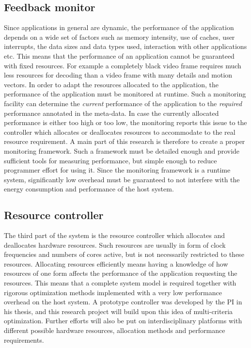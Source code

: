 \documentclass{article}
\begin{document}
\subsection{Feedback monitor}
Since applications in general are dynamic, the performance of the application depends on a wide set of factors such as memory intensity, use of caches, user interrupts, the data sizes and data types used, interaction with other applications etc. 
This means that the performance of an application cannot be guaranteed with fixed resources.
For example a completely black video frame requires much less resources for decoding than a video frame with many details and motion vectors.
In order to adapt the resources allocated to the application, the performance of the application must be monitored at runtime.
Such a monitoring facility can determine the \textit{current} performance of the application to the \textit{required} performance annotated in the meta-data.
In case the currently allocated performance is either too high or too low, the monitoring reports this issue to the controller which allocates or deallocates resources to accommodate to the real resource requirement.
A main part of this research is therefore to create a proper monitoring framework.
Such a framework must be detailed enough and provide sufficient tools for measuring performance, but simple enough to reduce programmer effort for using it.
Since the monitoring framework is a runtime system, significantly low overhead must be guaranteed to not interfere with the energy consumption and performance of the host system.

\subsection{Resource controller}
The third part of the system is the resource controller which allocates and deallocates hardware resources.
Such resources are usually in form of clock frequencies and numbers of cores active, but is not necessarily restricted to these resources.
Allocating resources efficiently means having a knowledge of how resources of one form affects the performance of the application requesting the resources.
This means that a complete system model is required together with rigorous optimization methods implemented with a very low performance overhead on the host system.
A prototype controller was developed by the PI in his thesis, and this research project will build upon this idea of multi-criteria optimization.
Further efforts will also be put on interdisciplinary platforms with different possible hardware resources, allocation methods and performance requirements.
\end{document}
